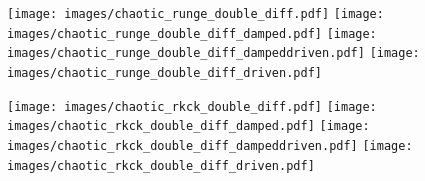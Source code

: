 \begin{multicols}{4}

{\centering\texttt{[image: images/chaotic\_runge\_double\_diff.pdf]}}
\label{fig:96}
\hfill
{\centering\texttt{[image: images/chaotic\_runge\_double\_diff\_damped.pdf]}}
\label{fig:97}
\hfill
{\centering\texttt{[image: images/chaotic\_runge\_double\_diff\_dampeddriven.pdf]}}
\label{fig:98}
\hfill
{\centering\texttt{[image: images/chaotic\_runge\_double\_diff\_driven.pdf]}}
\label{fig:99}
\hfill

\end{multicols}
\begin{multicols}{4}

{\centering\texttt{[image: images/chaotic\_rkck\_double\_diff.pdf]}}
\label{fig:100}
\hfill
{\centering\texttt{[image: images/chaotic\_rkck\_double\_diff\_damped.pdf]}}
\label{fig:101}
\hfill
{\centering\texttt{[image: images/chaotic\_rkck\_double\_diff\_dampeddriven.pdf]}}
\label{fig:102}
\hfill
{\centering\texttt{[image: images/chaotic\_rkck\_double\_diff\_driven.pdf]}}
\label{fig:103}
\hfill

\end{multicols}